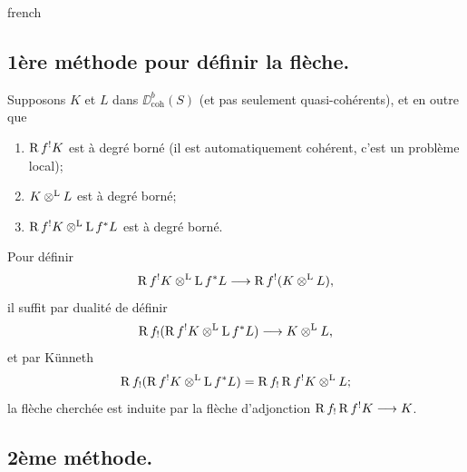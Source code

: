 \begin{hyphenrules}{french}
\subsection*{1\`ere m\'ethode pour d\'efinir la fl\`eche.}

Supposons $K$ et $L$ dans $\DD_{\operatorname{coh}}^{b}(S)$ (et pas seulement quasi-coh\'erents), et en outre que
\begin{enumerate}
\item[(a)] $\operatorname{R} f^{!}K$ est \`a degr\'e born\'e (il est automatiquement coh\'erent, c'est un probl\`eme local);
\item[(b)] $K \mathbin{\otimes^{\mathrm{L}}} L$ est \`a degr\'e born\'e;
\item[(c)] $\operatorname{R} f^{!}K \mathbin{\otimes^{\mathrm{L}}} \operatorname{L} f^{*}L$ est \`a degr\'e born\'e.
\end{enumerate}

Pour d\'efinir
\[
\operatorname{R} f^{!}K \mathbin{\otimes^{\mathrm{L}}} \operatorname{L} f^{*}L
 \longrightarrow \operatorname{R} f^{!}(K \mathbin{\otimes^{\mathrm{L}}} L),
\]
il suffit par dualit\'e de d\'efinir
\[
\operatorname{R} f_{!}(\operatorname{R} f^{!}K \mathbin{\otimes^{\mathrm{L}}} \operatorname{L} f^{*}L)
 \longrightarrow K \mathbin{\otimes^{\mathrm{L}}} L,
\]
et par K\"unneth
\[
\operatorname{R} f_{!}(\operatorname{R} f^{!}K \mathbin{\otimes^{\mathrm{L}}} \operatorname{L} f^{*}L)
 = \operatorname{R} f_{!}\operatorname{R} f^{!}K \mathbin{\otimes^{\mathrm{L}}} L;
\]
la fl\`eche cherch\'ee est induite par la fl\`eche d'adjonction
$\operatorname{R} f_{!}\operatorname{R} f^{!}K \longrightarrow K$.

\subsection*{2\`eme m\'ethode.}


\end{hyphenrules}
